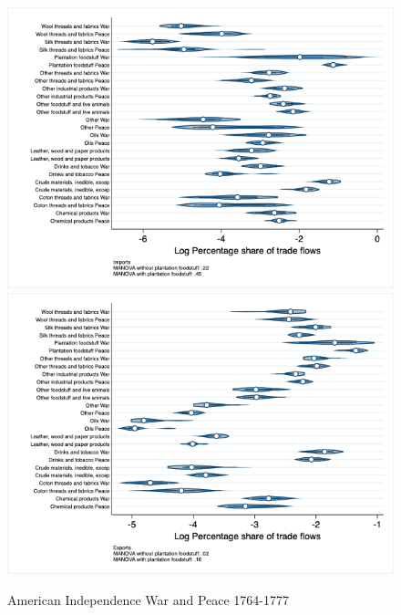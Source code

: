 \documentclass[12pt,a4paper,notitlepage,english]{article}
\begin{document}
\begin{appendix}
\begin{figure}[h!]
\centering
\caption{American Independence War and Peace 1764-1777}
\label{peace1764_1777_indep_nat_distr_sitc}
\includegraphics[scale=.4]{peace1764_1777_indep_nat_distr_Isitc}
\includegraphics[scale=.4]{peace1764_1777_indep_nat_distr_Xsitc}
\end{figure}


\end{appendix}
\end{document}
